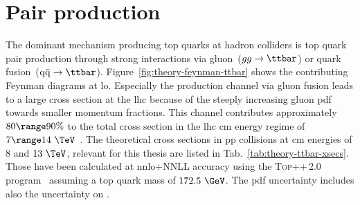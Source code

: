 \section{Pair production}
\label{sec:theory-ttbar-production}

The dominant mechanism producing top quarks at hadron colliders is top quark pair production through strong interactions via gluon~($gg\to\ttbar$) or quark fusion~($\mathrm{q}\bar{\mathrm{q}}\to\ttbar$). Figure~\ref{fig:theory-feynman-ttbar} shows the contributing Feynman diagrams at \gls{lo}. Especially the production channel via gluon fusion leads to a large cross section at the \gls{lhc} because of the steeply increasing gluon \gls{pdf} towards smaller momentum fractions. This channel contributes approximately $80\range90\%$ to the total cross section in the \gls{lhc} \acrlong{cm} energy regime of $7\range14~\TeV$~\cite{Olive:2016xmw}. The theoretical \ttbar cross sections in pp collisions at \acrlong{cm} energies of $8$ and $13~\TeV$, relevant for this thesis are listed in Tab.~\ref{tab:theory-ttbar-xsecs}. Those have been calculated at \gls{nnlo}+NNLL accuracy using the \textsc{Top++}\,2.0 program~\cite{Czakon:2011xx,Czakon:2013goa} assuming a top quark mass of $172.5~\GeV$. The \gls{pdf} uncertainty includes also the uncertainty on \as.

